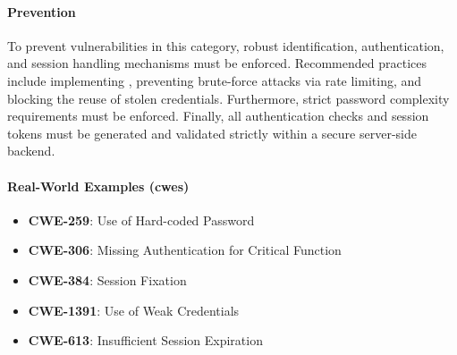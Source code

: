 \paragraph{Prevention} To prevent vulnerabilities in this category, robust identification, authentication, and session handling mechanisms must be enforced. Recommended practices include implementing , preventing brute-force attacks via rate limiting, and blocking the reuse of stolen credentials. Furthermore, strict password complexity requirements must be enforced. Finally, all authentication checks and session tokens must be generated and validated strictly within a secure server-side backend.

\paragraph{Real-World Examples (\glspl{cwe})}
\begin{itemize}
    \item \textbf{CWE-259}: Use of Hard-coded Password
    \item \textbf{CWE-306}: Missing Authentication for Critical Function
    \item \textbf{CWE-384}: Session Fixation
    \item \textbf{CWE-1391}: Use of Weak Credentials
    \item \textbf{CWE-613}: Insufficient Session Expiration
\end{itemize}
